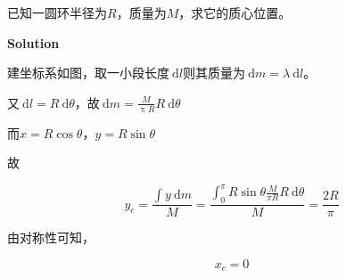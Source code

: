 \documentclass[12pt, a4paper]{article}
\numberwithin{equation}{section}
\newcommand{\rmd}{\mathrm{~d}}
\begin{document}
    已知一圆环半径为\(R\)，质量为\(M\)，求它的质心位置。
    \vspace{1em}

    \textbf{Solution}
    \vspace{1em}

    建坐标系如图，取一小段长度\(\rmd l\)则其质量为\(\rmd m = \lambda \rmd l\)。

    又\(\rmd l = R \rmd \theta\)，故\(\rmd m = \frac{M}{\uppi R} R \rmd \theta\)

    而\(x = R\cos \theta\)，\(y = R\sin \theta\)

    故

    $$
        y_c=\frac{\int y \mathrm{~d} m}{M}=\frac{\int_0^\pi R \sin \theta \frac{M}{\pi R} R \mathrm{~d} \theta}{M}=\frac{2 R}{\pi}
    $$

    由对称性可知，

    $$
        x_c = 0
    $$
\end{document}
